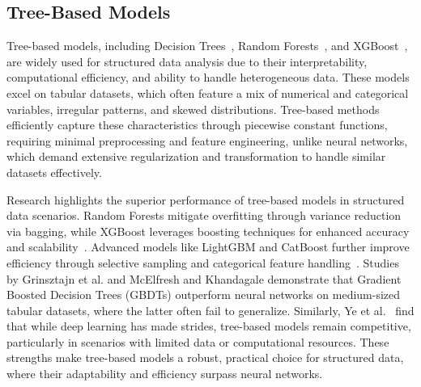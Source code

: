 \documentclass{ieeeaccess}
\begin{document}
\subsection{Tree-Based Models}


Tree-based models, including Decision Trees~\cite{decision_tree}, Random Forests~\cite{random_forest}, and XGBoost~\cite{XGBoost}, are widely used for structured data analysis due to their interpretability, computational efficiency, and ability to handle heterogeneous data. These models excel on tabular datasets, which often feature a mix of numerical and categorical variables, irregular patterns, and skewed distributions. Tree-based methods efficiently capture these characteristics through piecewise constant functions, requiring minimal preprocessing and feature engineering, unlike neural networks, which demand extensive regularization and transformation to handle similar datasets effectively.

Research highlights the superior performance of tree-based models in structured data scenarios. Random Forests mitigate overfitting through variance reduction via bagging, while XGBoost leverages boosting techniques for enhanced accuracy and scalability~\cite{Comparative_XGBoost}. Advanced models like LightGBM and CatBoost further improve efficiency through selective sampling and categorical feature handling~\cite{LightGBM, CatBoost}. Studies by Grinsztajn et al.\cite{tree_based_model} and McElfresh and Khandagale\cite{Outperform_Boosted_Trees} demonstrate that Gradient Boosted Decision Trees (GBDTs) outperform neural networks on medium-sized tabular datasets, where the latter often fail to generalize. Similarly, Ye et al.~\cite{Closer_Look} find that while deep learning has made strides, tree-based models remain competitive, particularly in scenarios with limited data or computational resources. These strengths make tree-based models a robust, practical choice for structured data, where their adaptability and efficiency surpass neural networks.
\end{document}

